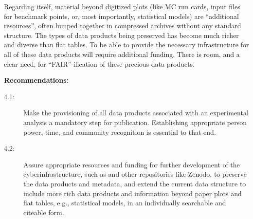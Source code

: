 \documentclass[11pt]{article}
\begin{document}
Regarding \hepdata itself, material beyond digitized plots (like MC run cards, input files for benchmark points, or, most importantly, statistical models) are ``additional resources'', often lumped together in compressed archives without any standard structure.
The types of data products being preserved has become much richer and diverse than flat tables.
To be able to provide the necessary infrastructure for all of these data products will require additional funding.
There is room, and a clear need, for ``FAIR''-ification of these precious data products. 

\noindent
\textbf{Recommendations:}
\begin{description}
   \item[4.1:] Make the provisioning of all data products associated with an experimental analysis a mandatory step for publication.
   Establishing appropriate person power, time, and community recognition is essential to that end.
   \item[4.2:] Assure appropriate resources and funding for further development of the cyberinfrastructure, such as \hepdata and other repositories like Zenodo, to preserve the data products and metadata, and extend the current data structure to include more rich data products and information beyond paper plots and flat tables, e.g., statistical models, in an individually searchable and citeable form.
\end{description}

\end{document}
